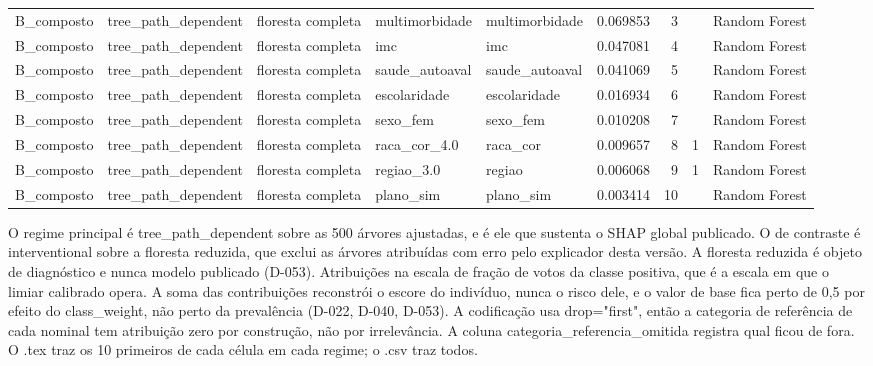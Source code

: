 \begin{tabular}{lllllrrll}
B_composto & tree_path_dependent & floresta completa & multimorbidade & multimorbidade & 0.069853 & 3 &  & Random Forest \\
B_composto & tree_path_dependent & floresta completa & imc & imc & 0.047081 & 4 &  & Random Forest \\
B_composto & tree_path_dependent & floresta completa & saude_autoaval & saude_autoaval & 0.041069 & 5 &  & Random Forest \\
B_composto & tree_path_dependent & floresta completa & escolaridade & escolaridade & 0.016934 & 6 &  & Random Forest \\
B_composto & tree_path_dependent & floresta completa & sexo_fem & sexo_fem & 0.010208 & 7 &  & Random Forest \\
B_composto & tree_path_dependent & floresta completa & raca_cor_4.0 & raca_cor & 0.009657 & 8 & 1 & Random Forest \\
B_composto & tree_path_dependent & floresta completa & regiao_3.0 & regiao & 0.006068 & 9 & 1 & Random Forest \\
B_composto & tree_path_dependent & floresta completa & plano_sim & plano_sim & 0.003414 & 10 &  & Random Forest \\
\bottomrule
\end{tabular}

\begin{flushleft}
\footnotesize O regime principal é tree\_path\_dependent sobre as 500 árvores ajustadas, e é ele que sustenta o SHAP global publicado. O de contraste é interventional sobre a floresta reduzida, que exclui as árvores atribuídas com erro pelo explicador desta versão. A floresta reduzida é objeto de diagnóstico e nunca modelo publicado (D-053). Atribuições na escala de fração de votos da classe positiva, que é a escala em que o limiar calibrado opera. A soma das contribuições reconstrói o escore do indivíduo, nunca o risco dele, e o valor de base fica perto de 0,5 por efeito do class\_weight, não perto da prevalência (D-022, D-040, D-053). A codificação usa drop="first", então a categoria de referência de cada nominal tem atribuição zero por construção, não por irrelevância. A coluna categoria\_referencia\_omitida registra qual ficou de fora. O .tex traz os 10 primeiros de cada célula em cada regime; o .csv traz todos.
\end{flushleft}
